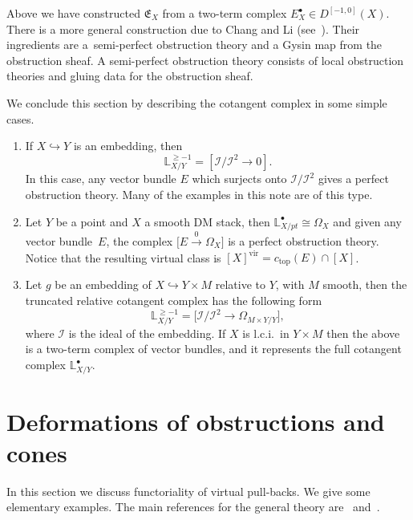 \documentclass[pdftex]{sigma}
\numberwithin{equation}{section}
\newcommand{\vv}{\mathrm{vir}}
\newcommand{\E}{\mathfrak E}
\theoremstyle{plain}
\theoremstyle{definition}
\theoremstyle{remark}
\begin{document}
\begin{Remark} Above we have constructed $\E_X$ from a two-term complex $E^{\bullet}_X\in D^{[-1,0]}(X)$. There is a more general construction due to Chang and Li (see~\cite{cl:semiperfect}). Their ingredients are a~semi-perfect obstruction theory and a Gysin map from the obstruction sheaf. A semi-perfect obstruction theory consists of local obstruction theories and gluing data for the obstruction sheaf.
\end{Remark}

\begin{Remark}\label{cotcpx} We conclude this section by describing the cotangent complex in some simple cases.
\begin{enumerate}\itemsep=0pt
\item If $X\hookrightarrow Y$ is an embedding, then
\[\mathbb L^{\geq -1}_{X/Y}=[\mathcal I/\mathcal I^2\to 0].\]
In this case, any vector bundle $E$ which surjects onto $\mathcal I/\mathcal I^2$ gives a perfect obstruction theory. Many of the examples in this note are of this type.
\item Let $Y$ be a point and $X$ a smooth DM stack, then $\mathbb L^\bullet_{X/pt}\cong \Omega_X$ and given any vector bundle~$E$, the complex $\big[E\xrightarrow{0} \Omega_X\big]$
is a perfect obstruction theory. Notice that the resulting virtual class is $[X]^{\vv}=c_{\text{top}}(E)\cap [X]$.
\item Let $g$ be an embedding of $X\hookrightarrow Y\times M$ relative to $Y$, with $M$ smooth, then the truncated relative cotangent complex has the following form
\[\mathbb L^{\geq -1}_{X/Y}=\big[\mathcal I/\mathcal I^2\to\Omega_{M\times Y/Y}\big],\]
where $\mathcal I$ is the ideal of the embedding. If $X$ is l.c.i.\ in $Y\times M$ then the above is a two-term complex of vector bundles, and it represents the full cotangent complex $\mathbb L^\bullet_{X/Y}$.
\end{enumerate}
\end{Remark}

\section{Deformations of obstructions and cones}\label{deformations}
In this section we discuss functoriality of virtual pull-backs. We give some elementary examples. The main references for the general theory are~\cite{KKP} and~\cite{vir-pull}.
\end{document}
